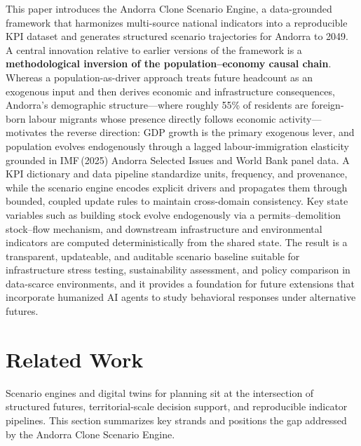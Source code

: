 \documentclass{article}
\begin{document}
This paper introduces the Andorra Clone Scenario Engine, a data-grounded
framework that harmonizes multi-source national indicators into a reproducible
KPI dataset and generates structured scenario trajectories for Andorra to 2049.
A central innovation relative to earlier versions of the framework is a
\textbf{methodological inversion of the population--economy causal chain}.
Whereas a population-as-driver approach treats future headcount as an
exogenous input and then derives economic and infrastructure consequences,
Andorra's demographic structure---where roughly 55\% of residents are
foreign-born labour migrants whose presence directly follows economic
activity---motivates the reverse direction: GDP growth is the primary
exogenous lever, and population evolves endogenously through a lagged
labour-immigration elasticity grounded in IMF\,(2025) Andorra Selected Issues
and World Bank panel data. A KPI dictionary and data pipeline standardize units,
frequency, and provenance, while the scenario engine encodes explicit drivers
and propagates them through bounded, coupled update rules to maintain
cross-domain consistency. Key state variables such as building stock evolve
endogenously via a permits--demolition stock--flow mechanism, and downstream
infrastructure and environmental indicators are computed deterministically from
the shared state. The result
is a transparent, updateable, and auditable scenario baseline suitable for
infrastructure stress testing, sustainability assessment, and policy comparison
in data-scarce environments, and it provides a foundation for future extensions
that incorporate humanized AI agents to study behavioral responses under
alternative futures.

\section{Related Work}

Scenario engines and digital twins for planning sit at the intersection of
structured futures, territorial-scale decision support, and reproducible
indicator pipelines. This section summarizes key strands and positions the gap
addressed by the Andorra Clone Scenario Engine.
\end{document}
